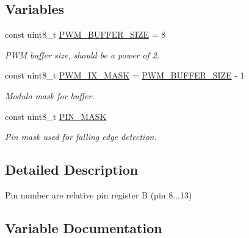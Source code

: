 \subsection*{Variables}
\begin{DoxyCompactItemize}
\item 
const uint8\+\_\+t \hyperlink{group__PwmInputConstants_gae2449e7e1058591bfbfdc0901c185602}{P\+W\+M\+\_\+\+B\+U\+F\+F\+E\+R\+\_\+\+S\+I\+ZE} = 8\hypertarget{group__PwmInputConstants_gae2449e7e1058591bfbfdc0901c185602}{}\label{group__PwmInputConstants_gae2449e7e1058591bfbfdc0901c185602}

\begin{DoxyCompactList}\small\item\em P\+WM buffer size, should be a power of 2. \end{DoxyCompactList}\item 
const uint8\+\_\+t \hyperlink{group__PwmInputConstants_gafe4b1ae7ffab8edfcd8452cd3fb7bb74}{P\+W\+M\+\_\+\+I\+X\+\_\+\+M\+A\+SK} = \hyperlink{group__PwmInputConstants_gae2449e7e1058591bfbfdc0901c185602}{P\+W\+M\+\_\+\+B\+U\+F\+F\+E\+R\+\_\+\+S\+I\+ZE} -\/ 1\hypertarget{group__PwmInputConstants_gafe4b1ae7ffab8edfcd8452cd3fb7bb74}{}\label{group__PwmInputConstants_gafe4b1ae7ffab8edfcd8452cd3fb7bb74}

\begin{DoxyCompactList}\small\item\em Modulo mask for buffer. \end{DoxyCompactList}\item 
const uint8\+\_\+t \hyperlink{group__PwmInputConstants_ga89098a2ff03e736c257b322e78e7c6e3}{P\+I\+N\+\_\+\+M\+A\+SK}
\begin{DoxyCompactList}\small\item\em Pin mask used for falling edge detection. \end{DoxyCompactList}\end{DoxyCompactItemize}


\subsection{Detailed Description}
Pin number are relative pin register B (pin 8...13) 

\subsection{Variable Documentation}
